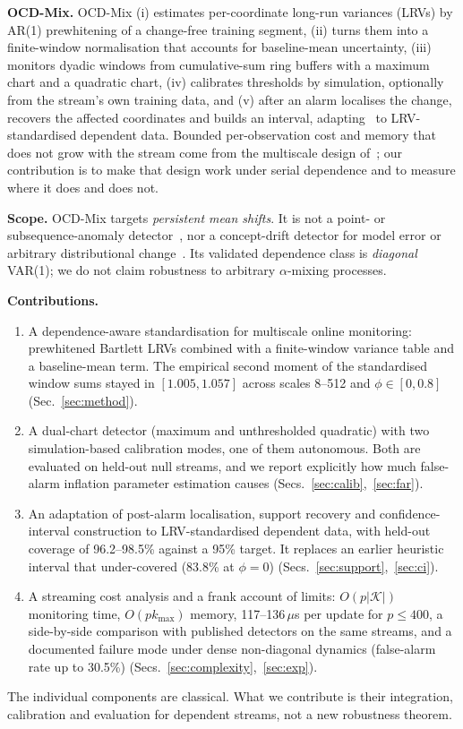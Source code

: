 \documentclass[conference]{IEEEtran}
\begin{document}
\textbf{OCD-Mix.} OCD-Mix (i) estimates per-coordinate long-run variances (LRVs) by AR(1) prewhitening of a change-free training segment, (ii) turns them into a finite-window normalisation that accounts for baseline-mean uncertainty, (iii) monitors dyadic windows from cumulative-sum ring buffers with a maximum chart and a quadratic chart, (iv) calibrates thresholds by simulation, optionally from the stream's own training data, and (v) after an alarm localises the change, recovers the affected coordinates and builds an interval, adapting~\cite{chen2024} to LRV-standardised dependent data. Bounded per-observation cost and memory that does not grow with the stream come from the multiscale design of~\cite{chen2022}; our contribution is to make that design work under serial dependence and to measure where it does and does not.

\textbf{Scope.} OCD-Mix targets \emph{persistent mean shifts}. It is not a point- or subsequence-anomaly detector~\cite{schmidl2022,tuli2022}, nor a concept-drift detector for model error or arbitrary distributional change~\cite{gama2014,lu2019}. Its validated dependence class is \emph{diagonal} VAR(1); we do not claim robustness to arbitrary $\alpha$-mixing processes.

\textbf{Contributions.}
\begin{enumerate}
\item A dependence-aware standardisation for multiscale online monitoring: prewhitened Bartlett LRVs combined with a finite-window variance table and a baseline-mean term. The empirical second moment of the standardised window sums stayed in $[1.005,1.057]$ across scales 8--512 and $\phi\in[0,0.8]$ (Sec.~\ref{sec:method}).
\item A dual-chart detector (maximum and unthresholded quadratic) with two simulation-based calibration modes, one of them autonomous. Both are evaluated on held-out null streams, and we report explicitly how much false-alarm inflation parameter estimation causes (Secs.~\ref{sec:calib},~\ref{sec:far}).
\item An adaptation of post-alarm localisation, support recovery and confidence-interval construction to LRV-standardised dependent data, with held-out coverage of 96.2--98.5\% against a 95\% target. It replaces an earlier heuristic interval that under-covered (83.8\% at $\phi=0$) (Secs.~\ref{sec:support},~\ref{sec:ci}).
\item A streaming cost analysis and a frank account of limits: $O(p|\mathcal{K}|)$ monitoring time, $O(pk_{\max})$ memory, 117--136\,$\mu$s per update for $p\le 400$, a side-by-side comparison with published detectors on the same streams, and a documented failure mode under dense non-diagonal dynamics (false-alarm rate up to 30.5\%) (Secs.~\ref{sec:complexity},~\ref{sec:exp}).
\end{enumerate}
The individual components are classical. What we contribute is their integration, calibration and evaluation for dependent streams, not a new robustness theorem.
\end{document}

